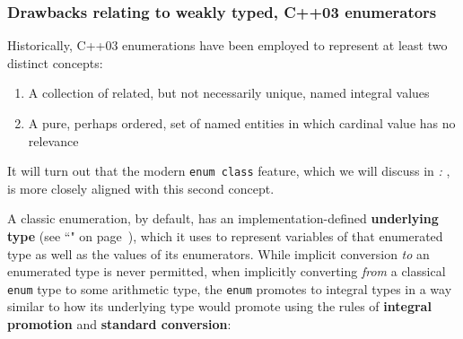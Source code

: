 \subsubsection[Drawbacks relating to weakly typed, C++03 enumerators]{Drawbacks relating to weakly typed, C++03 enumerators}\label{drawbacks-relating-to-weakly-typed,-c++03-enumerators}

Historically, C++03 enumerations have been employed to represent at
least two distinct concepts:

\begin{enumerate}
\item{A collection of related, but not necessarily unique, named integral values}
\item{A pure, perhaps ordered, set of named entities in which cardinal value has no relevance}
\end{enumerate}

\noindent It will turn out that the modern \texttt{enum}~\texttt{class} feature,
which we will discuss in \textit{: }, is more closely aligned with this second
concept.

A classic enumeration, by default, has an implementation-defined
\textbf{underlying type} (see ``" on page~\pageref{explicit-enumeration-underlying-type}), which it uses to represent
variables of that enumerated type as well as the values of its
enumerators. While implicit conversion \emph{to} an enumerated type is
never permitted, when implicitly converting \emph{from} a classical
\texttt{enum} type to some arithmetic type, the \texttt{enum} promotes
to integral types in a way similar to how its underlying type would
promote using the rules of \textbf{integral promotion} and
\textbf{standard conversion}:

